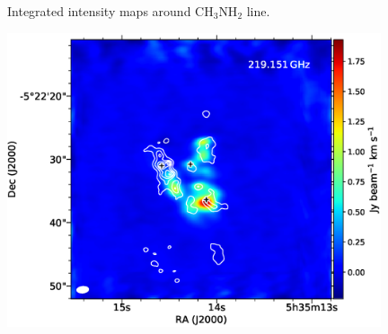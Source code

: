 \begin{figure}[H]
\begin{center}
\begin{minipage}{0.98\textwidth}
\begin{center}
\begin{minipage}{0.48\textwidth}
\begin{center}
\end{center}
\end{minipage}
\end{center}
\end{minipage}
\caption{Integrated intensity maps around CH$_{3}$NH$_{2}$ line.}
\end{center}
\end{figure}

\newpage

\begin{figure}[H] 
\begin{center}
\begin{minipage}{0.98\textwidth} 
\begin{center}
\begin{minipage}{0.48\textwidth}
\begin{center}
\includegraphics[width=0.98\textwidth]{OrionKL/mom0/219.151mom0_3-7.eps}
\end{center}
\end{minipage}
\begin{minipage}{0.48\textwidth}
\begin{center}

\end{center}
\end{minipage}
\end{center}
\end{minipage}
\end{center}
\end{figure}
